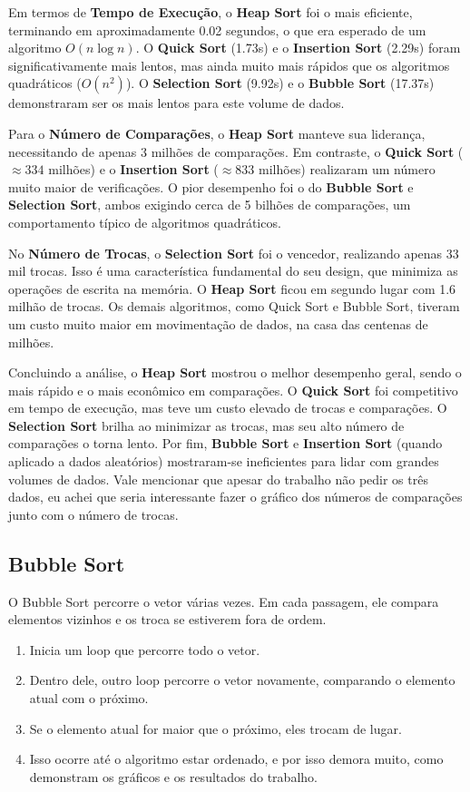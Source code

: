 \documentclass[a4paper]{article}
\begin{document}
    Em termos de \textbf{Tempo de Execução}, o \textbf{Heap Sort} foi o mais eficiente, terminando em aproximadamente 0.02 segundos, o que era esperado de um algoritmo $O(n \log n)$. O \textbf{Quick Sort} (1.73s) e o \textbf{Insertion Sort} (2.29s) foram significativamente mais lentos, mas ainda muito mais rápidos que os algoritmos quadráticos ($O(n^2)$). O \textbf{Selection Sort} (9.92s) e o \textbf{Bubble Sort} (17.37s) demonstraram ser os mais lentos para este volume de dados.

    Para o \textbf{Número de Comparações}, o \textbf{Heap Sort} manteve sua liderança, necessitando de apenas 3 milhões de comparações. Em contraste, o \textbf{Quick Sort} ($\approx 334$ milhões) e o \textbf{Insertion Sort} ($\approx 833$ milhões) realizaram um número muito maior de verificações. O pior desempenho foi o do \textbf{Bubble Sort} e \textbf{Selection Sort}, ambos exigindo cerca de 5 bilhões de comparações, um comportamento típico de algoritmos quadráticos.

    No \textbf{Número de Trocas}, o \textbf{Selection Sort} foi o vencedor, realizando apenas 33 mil trocas.
    Isso é uma característica fundamental do seu design, que minimiza as operações de escrita na memória. O \textbf{Heap Sort} ficou em segundo lugar com 1.6 milhão de trocas. Os demais algoritmos, como Quick Sort e Bubble Sort, tiveram um custo muito maior em movimentação de dados, na casa das centenas de milhões.

    Concluindo a análise, o \textbf{Heap Sort} mostrou o melhor desempenho geral, sendo o mais rápido e o mais econômico em comparações. O \textbf{Quick Sort} foi competitivo em tempo de execução, mas teve um custo elevado de trocas e comparações. O \textbf{Selection Sort} brilha ao minimizar as trocas, mas seu alto número de comparações o torna lento. Por fim, \textbf{Bubble Sort} e \textbf{Insertion Sort} (quando aplicado a dados aleatórios) mostraram-se ineficientes para lidar com grandes volumes de dados.
    Vale mencionar que apesar do trabalho não pedir os três dados, eu achei que seria interessante fazer o gráfico dos números de comparações junto com o número de trocas.

    \subsection{Bubble Sort}\label{subsec:bubble-sort}
    O Bubble Sort percorre o vetor várias vezes.
    Em cada passagem, ele compara elementos vizinhos e os troca se estiverem fora de ordem.
    \begin{enumerate}
        \item Inicia um loop que percorre todo o vetor.
        \item Dentro dele, outro loop percorre o vetor novamente, comparando o elemento atual com o próximo.
        \item Se o elemento atual for maior que o próximo, eles trocam de lugar.
        \item Isso ocorre até o algoritmo estar ordenado, e por isso demora muito, como demonstram os gráficos e os resultados do trabalho.
    \end{enumerate}
\end{document}
